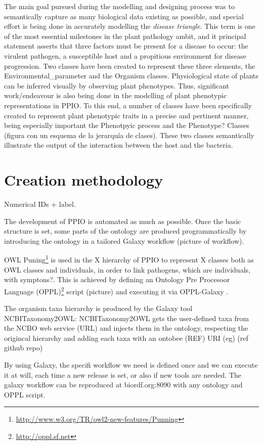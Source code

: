 \documentclass[sw]{iosart2c}
\newcommand{\myurl}[1]{\footnote{\url{#1}}}
\begin{document}
The main goal pursued during the modelling and designing process was to semantically capture as many biological data existing as possible, and special effort is being done in accurately modelling the {\itshape disease triangle}. This term is one of the most essential milestones in the plant pathology ambit, and it principal statement asserts that three factors must be present for a disease to occur: the virulent pathogen, a susceptible host and a propitious environment for disease progression. Two classes have been created to represent these three elements, the Environmental\_parameter and the Organism classes.
Physiological state of plants can be inferred visually by observing plant phenotypes. Thus, significant work/endeavour is also being done in the modelling of plant phenotypic representations in PPIO. To this end, a number of classes have been specifically created to represent plant phenotypic traits in a precise and pertinent manner, being especially important the Phenotpyic process and the Phenotype? Classes (figura con un esquema de la jerarquía de clases). These two classes semantically illustrate the output of the interaction between the host and the bacteria. 


\section{Creation methodology}

Numerical IDs + label.

The development of PPIO is automated as much as possible. Once the basic structure is set, some parts of the ontology are produced programmatically by introducing the ontology in a tailored Galaxy \cite{galaxy} workflow  (picture of workflow). 

OWL Puning\myurl{http://www.w3.org/TR/owl2-new-features/Punning} is used in the X hierarchy of PPIO to represent X classes both as OWL classes and individuals, in order to link pathogens, which are individuals, with symptons?. This is achieved by defining an Ontology Pre Procesoor Language (OPPL)\myurl{http://oppl.sf.net} script (picture) and executing it via OPPL-Galaxy \cite{OPPL-Galaxy-JBMS}.

The organism taxa hierarchy is produced by the Galaxy tool NCBITaxonomy2OWL: NCBITaxonomy2OWL gets the user-defined taxa from the NCBO web service (URL) and injects them in the ontology, respecting the origincal hierarchy and adding each taxa with an ontobee (REF) URI (eg) (ref github repo)

By using Galaxy, the specifi workflow we need is defined once and we can execute it at will, each time a new release is set, or also if new tools are needed. The galaxy workflow can be reproduced at biordf.org:8090 with any ontology and OPPL script.
\end{document}
